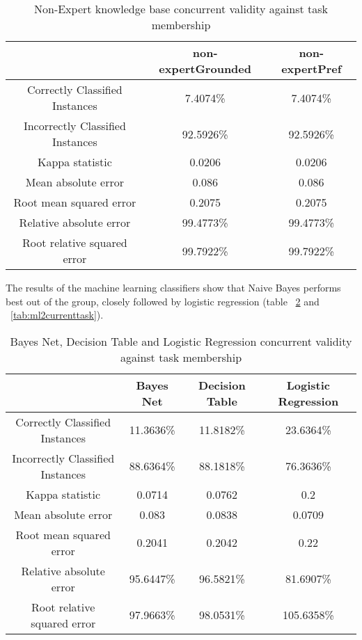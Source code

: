\begin{table}[!htbp]
\centering
\begin{tabular}{|c|c|c|}
\hline
                                 & non-expertGrounded  & non-expertPref \\ \hline
Correctly Classified Instances   & 7.4074\%         & 7.4074\%  \\
Incorrectly Classified Instances & 92.5926\%        & 92.5926\%  \\
Kappa statistic                  & 0.0206           & 0.0206  \\
Mean absolute error              & 0.086            & 0.086   \\
Root mean squared error          & 0.2075           & 0.2075  \\
Relative absolute error          & 99.4773\%       & 99.4773\%  \\
Root relative squared error      & 99.7922\%       & 99.7922\%  \\
\hline
\end{tabular}
\caption{Non-Expert knowledge base concurrent validity against task membership}
\label{tab:necurrenttask}
\end{table}

The results of the machine learning classifiers show that Naive Bayes performs best out of the group, closely followed by logistic regression (table ~\ref{tab:ml1currenttask} and ~\ref{tab:ml2currenttask}). 

\begin{table}[!htbp]
\centering
\begin{tabular}{|c|c|c|c|}
\hline
                                 & Bayes Net  & Decision Table  & Logistic Regression \\ \hline
Correctly Classified Instances   & 11.3636\%      & 11.8182\%  & 23.6364\%  \\
Incorrectly Classified Instances & 88.6364\%      & 88.1818\% & 76.3636\%   \\
Kappa statistic                  & 0.0714         & 0.0762    & 0.2         \\
Mean absolute error              & 0.083          & 0.0838    & 0.0709      \\
Root mean squared error          & 0.2041         & 0.2042    & 0.22        \\
Relative absolute error          & 95.6447\%      & 96.5821\% & 81.6907\%   \\
Root relative squared error      & 97.9663\%      & 98.0531\% & 105.6358\%  \\
\hline
\end{tabular}
\caption{Bayes Net, Decision Table and Logistic Regression concurrent validity against task membership}
\label{tab:ml1currenttask}
\end{table}


